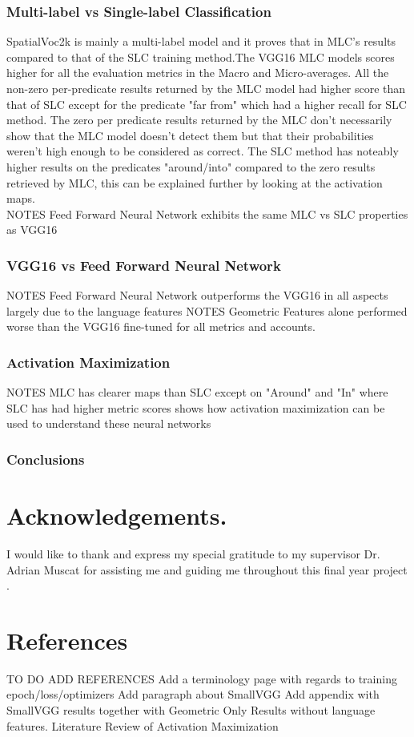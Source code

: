 \documentclass{csfyp}
\begin{document}
\subsubsection{Multi-label vs Single-label Classification}
SpatialVoc2k is mainly a multi-label model and it proves that in MLC's results compared to that of the SLC training method.The VGG16 MLC models scores higher for all the evaluation metrics in the Macro and Micro-averages. All the non-zero per-predicate results returned by the MLC model had higher score than that of SLC except for the predicate "far from" which had a higher recall for SLC method. The zero per predicate results returned by the MLC don't necessarily show that the MLC model doesn't detect them but that their probabilities weren't high enough to be considered as correct. The SLC method has noteably higher results on the predicates "around/into" compared to the zero results retrieved by MLC, this can be explained further by looking at the activation maps.
\\
NOTES Feed Forward Neural Network exhibits the same MLC vs SLC properties as VGG16
\subsubsection{VGG16 vs Feed Forward Neural Network}
NOTES Feed Forward Neural Network outperforms the VGG16 in all aspects largely due to the language features
NOTES Geometric Features alone performed worse than the VGG16 fine-tuned for all metrics and accounts.
\subsubsection{Activation Maximization}
NOTES MLC has clearer maps than SLC except on "Around" and "In" where SLC has had higher
metric scores shows how activation maximization can be used to understand these neural networks
 
\subsubsection{Conclusions}


\section*{Acknowledgements.}
I would like to thank and express my special gratitude to my supervisor Dr. Adrian Muscat for assisting me and guiding me throughout this final year project .

\section{References}
TO DO ADD REFERENCES 
Add a terminology page with regards to training epoch/loss/optimizers 
Add paragraph about SmallVGG 
Add appendix with SmallVGG results together with Geometric Only Results without language features.
Literature Review of Activation Maximization
\end{document}

